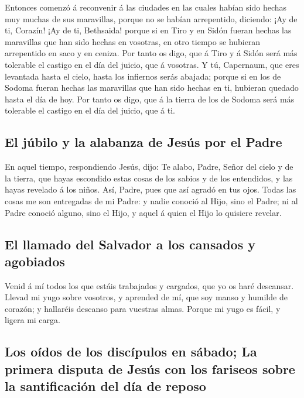  Entonces comenzó á reconvenir á las ciudades en las cuales
habían sido hechas muy muchas de sus maravillas, porque no se habían
arrepentido, diciendo:  ¡Ay de ti, Corazín! ¡Ay de ti,
Bethsaida! porque si en Tiro y en Sidón fueran hechas las maravillas que
han sido hechas en vosotras, en otro tiempo se hubieran arrepentido en
saco y en ceniza.  Por tanto os digo, que á Tiro y á Sidón
será más tolerable el castigo en el día del juicio, que á vosotras.
 Y tú, Capernaum, que eres levantada hasta el cielo, hasta
los infiernos serás abajada; porque si en los de Sodoma fueran hechas
las maravillas que han sido hechas en ti, hubieran quedado hasta el día
de hoy.  Por tanto os digo, que á la tierra de los de
Sodoma será más tolerable el castigo en el día del juicio, que á ti.

\hypertarget{el-juxfabilo-y-la-alabanza-de-jesuxfas-por-el-padre}{%
\subsection{El júbilo y la alabanza de Jesús por el
Padre}\label{el-juxfabilo-y-la-alabanza-de-jesuxfas-por-el-padre}}

 En aquel tiempo, respondiendo Jesús, dijo: Te alabo,
Padre, Señor del cielo y de la tierra, que hayas escondido estas cosas
de los sabios y de los entendidos, y las hayas revelado á los niños.
 Así, Padre, pues que así agradó en tus ojos. 
Todas las cosas me son entregadas de mi Padre: y nadie conoció al Hijo,
sino el Padre; ni al Padre conoció alguno, sino el Hijo, y aquel á quien
el Hijo lo quisiere revelar.

\hypertarget{el-llamado-del-salvador-a-los-cansados-y-agobiados}{%
\subsection{El llamado del Salvador a los cansados
\hspace{0pt}\hspace{0pt}y
agobiados}\label{el-llamado-del-salvador-a-los-cansados-y-agobiados}}

 Venid á mí todos los que estáis trabajados y cargados, que
yo os haré descansar.  Llevad mi yugo sobre vosotros, y
aprended de mí, que soy manso y humilde de corazón; y hallaréis descanso
para vuestras almas.  Porque mi yugo es fácil, y ligera mi
carga.

\hypertarget{los-ouxeddos-de-los-discuxedpulos-en-suxe1bado-la-primera-disputa-de-jesuxfas-con-los-fariseos-sobre-la-santificaciuxf3n-del-duxeda-de-reposo}{%
\subsection{Los oídos de los discípulos en sábado; La primera disputa de
Jesús con los fariseos sobre la santificación del día de
reposo}\label{los-ouxeddos-de-los-discuxedpulos-en-suxe1bado-la-primera-disputa-de-jesuxfas-con-los-fariseos-sobre-la-santificaciuxf3n-del-duxeda-de-reposo}}

